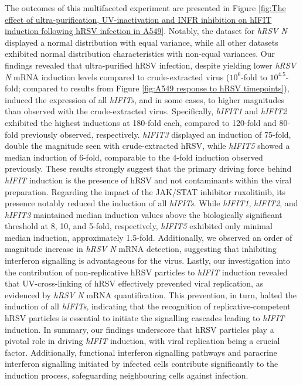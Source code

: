 The outcomes of this multifaceted experiment are presented in Figure \ref{fig:The effect of ultra-purification, UV-inactivation and INFR inhibition on hIFIT induction following hRSV infection in A549}. Notably, the dataset for \textit{hRSV N} displayed a normal distribution with equal variance, while all other datasets exhibited normal distribution characteristics with non-equal variances. Our findings revealed that ultra-purified hRSV infection, despite yielding lower \textit{hRSV N} mRNA induction levels compared to crude-extracted virus (\(10^6\)-fold to \(10^{4.5}\)-fold; compared to results from Figure \ref{fig:A549 response to hRSV timepoints}), induced the expression of all \textit{hIFITs}, and in some cases, to higher magnitudes than observed with the crude-extracted virus. Specifically, \textit{hIFIT1} and \textit{hIFIT2} exhibited the highest inductions at 180-fold each, compared to 120-fold and 80-fold previously observed, respectively. \textit{hIFIT3} displayed an induction of 75-fold, double the magnitude seen with crude-extracted hRSV, while \textit{hIFIT5} showed a median induction of 6-fold, comparable to the 4-fold induction observed previously. These results strongly suggest that the primary driving force behind \textit{hIFIT} induction is the presence of hRSV and not contaminants within the viral preparation. Regarding the impact of the JAK/STAT inhibitor ruxolitinib, its presence notably reduced the induction of all \textit{hIFITs}. While \textit{hIFIT1}, \textit{hIFIT2}, and \textit{hIFIT3} maintained median induction values above the biologically significant threshold at 8, 10, and 5-fold, respectively, \textit{hIFIT5} exhibited only minimal median induction, approximately 1.5-fold. Additionally, we observed an order of magnitude increase in \textit{hRSV N} mRNA detection, suggesting that inhibiting interferon signalling is advantageous for the virus. Lastly, our investigation into the contribution of non-replicative hRSV particles to \textit{hIFIT} induction revealed that UV-cross-linking of hRSV effectively prevented viral replication, as evidenced by \textit{hRSV N} mRNA quantification. This prevention, in turn, halted the induction of all \textit{hIFITs}, indicating that the recognition of replicative-competent hRSV particles is essential to initiate the signalling cascades leading to \textit{hIFIT} induction. In summary, our findings underscore that hRSV particles play a pivotal role in driving \textit{hIFIT} induction, with viral replication being a crucial factor. Additionally, functional interferon signalling pathways and paracrine interferon signalling initiated by infected cells contribute significantly to the induction process, safeguarding neighbouring cells against infection.

